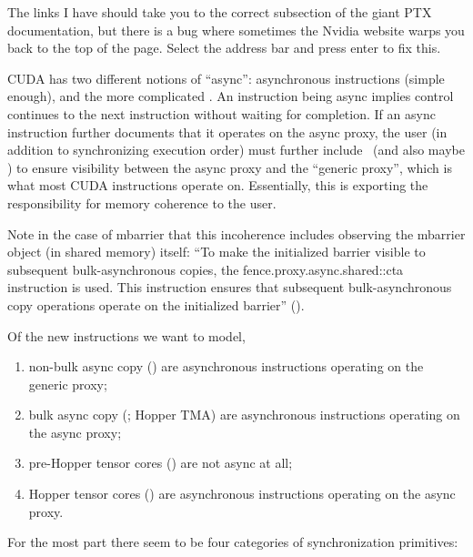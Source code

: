  The links I have should take you to the correct subsection of the giant PTX documentation, but there is a bug where sometimes the Nvidia website warps you back to the top of the page. Select the address bar and press enter to fix this.

\filbreak
{}

CUDA has two different notions of ``async'': asynchronous instructions (simple enough), and the more complicated . An instruction being async implies control continues to the next instruction without waiting for completion. If an async instruction further documents that it operates on the async proxy, the user (in addition to synchronizing execution order) must further include \fenceProxyAsync\ (and also maybe \wgmmaFence) to ensure visibility between the async proxy and the ``generic proxy'', which is what most CUDA instructions operate on. Essentially, this is exporting the responsibility for memory coherence to the user.

Note in the case of mbarrier that this incoherence includes observing the mbarrier object (in shared memory) itself: ``To make the initialized barrier visible to subsequent bulk-asynchronous copies, the fence.proxy.async.shared::cta instruction is used. This instruction ensures that subsequent bulk-asynchronous copy operations operate on the initialized barrier'' ().

\filbreak
Of the new instructions we want to model,

\begin{enumerate}
  \item non-bulk async copy (\cpAsync) are asynchronous instructions operating on the generic proxy;
  \item bulk async copy (\cpAsyncBulk; Hopper TMA) are asynchronous instructions operating on the async proxy;
  \item pre-Hopper tensor cores () are not async at all;
  \item Hopper tensor cores (\wgmma) are asynchronous instructions operating on the async proxy.
\end{enumerate}

\filbreak
For the most part there seem to be four categories of synchronization primitives:

